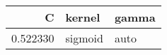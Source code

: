 \begin{tabular}{rll}
\toprule
C & kernel & gamma \\
\midrule
0.522330 & sigmoid & auto \\
\bottomrule
\end{tabular}
